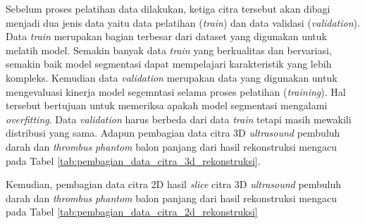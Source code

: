 {Sebelum proses pelatihan data dilakukan, ketiga citra tersebut akan dibagi menjadi dua jenis data yaitu data pelatihan (\textit{train}) dan data validasi (\textit{validation}). Data \textit{train} merupakan bagian terbesar dari dataset yang digunakan untuk melatih model. Semakin banyak data \textit{train} yang berkualitas dan bervariasi, semakin baik model segmentasi dapat mempelajari karakteristik yang lebih kompleks. Kemudian data \textit{validation} merupakan data yang digunakan untuk mengevaluasi kinerja model segemntasi selama proses pelatihan (\textit{training}). Hal tersebut bertujuan untuk memeriksa apakah model segmentasi mengalami \textit{overfitting}. Data \textit{validation} harus berbeda dari data \textit{train} tetapi masih mewakili distribusi yang sama. Adapun pembagian data citra 3D \textit{ultrasound} pembuluh darah dan \textit{thrombus} \textit{phantom} balon panjang dari hasil rekonstruksi mengacu pada Tabel \ref{tab:pembagian_data_citra_3d_rekonstruksi}.

\begin{table}[htbp]
	\centering
	\caption{Pembagian data citra 3D \textit{ultrasound} pembuluh darah dan \textit{thrombus} \textit{phantom} balon panjang}
	\label{tab:pembagian_data_citra_3d_rekonstruksi}
\end{table}

Kemudian, pembagian data citra 2D hasil \textit{slice} citra 3D \textit{ultrasound} pembuluh darah dan \textit{thrombus} \textit{phantom} balon panjang dari hasil rekonstruksi mengacu pada Tabel \ref{tab:pembagian_data_citra_2d_rekonstruksi}

}
